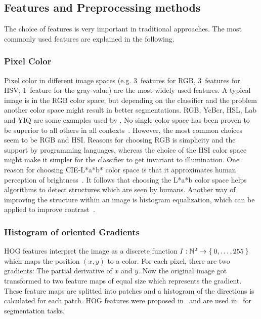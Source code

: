 
\subsection{Features and Preprocessing methods}\label{subsec:features}%
The choice of features is very important in traditional approaches.
The most commonly used features are explained in the following.

\subsubsection{Pixel Color}
Pixel color in different image spaces (e.g. 3~features for RGB, 3~features for
HSV, 1~feature for the gray-value) are the most widely used features. A typical
image is in the RGB color space, but depending on the classifier and the
problem another color space might result in better segmentations. RGB, YcBcr,
HSL, Lab and YIQ are some examples used by \cite{cohen2015memory}. No single
color space has been proven to be superior to all others in all
contexts~\cite{cheng2001color}. However, the most common choices seem to be RGB
and HSI. Reasons for choosing RGB is simplicity and the support by programming
languages, whereas the choice of the HSI color space might make it simpler for
the classifier to get invariant to illumination. One reason for choosing
CIE-L*a*b* color space is that it approximates human perception of
brightness~\cite{kasson1992analysis}. It follows that choosing the L*a*b color
space helps algorithms to detect structures which are seen by humans. Another
way of improving the structure within an image is histogram equalization, which
can be applied to improve contrast~\cite{pizer1987adaptive,4228537}.

\subsubsection{Histogram of oriented Gradients}
\Gls{HOG} features interpret the image as a discrete function
$I: \mathbb{N}^2 \rightarrow \Set{0, \dots, 255}$ which maps the position $(x,
y)$ to a color. For each pixel, there are two gradients: The partial derivative
of $x$ and $y$. Now the original image got transformed to two feature maps of
equal size which represents the gradient. These feature maps are splitted into
patches and a histogram of the directions is calculated for each patch.
\gls{HOG} features were proposed in~\cite{1467360} and are used
in~\cite{bourdev2010detecting,felzenszwalb2010object} for segmentation tasks.


